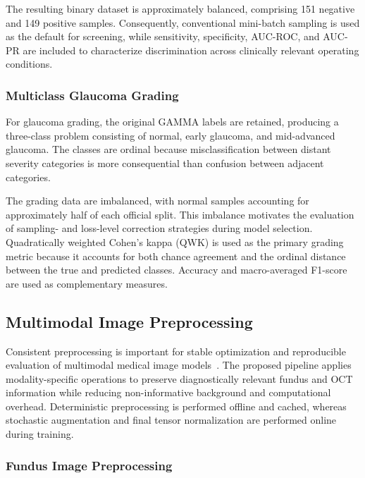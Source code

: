\documentclass[sn-mathphys]{sn-jnl}%
\theoremstyle{thmstyleone}%
\theoremstyle{thmstyletwo}%
\theoremstyle{thmstylethree}%
\begin{document}
The resulting binary dataset is approximately balanced, comprising 151 negative and 149 positive samples. Consequently, conventional mini-batch sampling is used as the default for screening, while sensitivity, specificity, AUC-ROC, and AUC-PR are included to characterize discrimination across clinically relevant operating conditions.

\subsubsection{Multiclass Glaucoma Grading}
\label{subsubsec:multiclass_grading}

For glaucoma grading, the original GAMMA labels are retained, producing a three-class problem consisting of normal, early glaucoma, and mid-advanced glaucoma. The classes are ordinal because misclassification between distant severity categories is more consequential than confusion between adjacent categories.

The grading data are imbalanced, with normal samples accounting for approximately half of each official split. This imbalance motivates the evaluation of sampling- and loss-level correction strategies during model selection. Quadratically weighted Cohen's kappa (QWK) is used as the primary grading metric because it accounts for both chance agreement and the ordinal distance between the true and predicted classes. Accuracy and macro-averaged F1-score are used as complementary measures.

\subsection{Multimodal Image Preprocessing}
\label{subsec:preprocessing}

Consistent preprocessing is important for stable optimization and reproducible evaluation of multimodal medical image models~\cite{virbukaite2023impact,sun2025hybrid}. The proposed pipeline applies modality-specific operations to preserve diagnostically relevant fundus and OCT information while reducing non-informative background and computational overhead. Deterministic preprocessing is performed offline and cached, whereas stochastic augmentation and final tensor normalization are performed online during training.


\subsubsection{Fundus Image Preprocessing}
\label{subsubsec:fundus_preprocessing}
\end{document}
